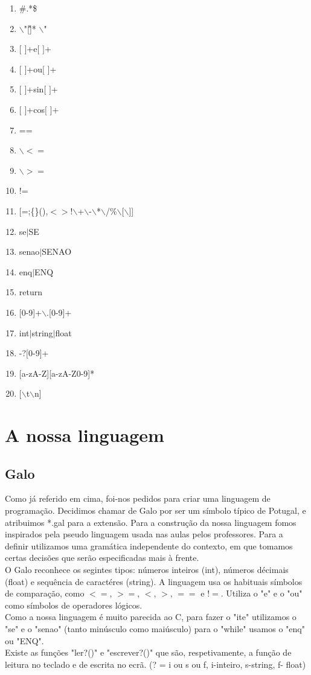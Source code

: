 \documentclass{report}
\begin{document}
\begin{enumerate}
	\item \#.*\$  
	\item $\backslash$"[\^\"]* $\backslash$"
	\item $[$ $]$+e$[$ $]$+
	\item $[$ $]$+ou$[$ $]$+
	\item $[$ $]$+sin$[$ $]$+
	\item $[$ $]$+cos$[$ $]$+
	\item ==
	\item $\backslash$$<=$
	\item $\backslash$$>=$
	\item !=
	\item $[$=;\{\}(),$<>$!$\backslash$+$\backslash$-$\backslash$*$\backslash$/\%$\backslash$[$\backslash$]]
	\item se$|$SE
	\item senao$|$SENAO 
	\item enq$|$ENQ
	\item return
	\item $[$0-9]+$\backslash$.[0-9]+ 
	\item int$|$string$|$float 
	\item -?$[$0-9]+
	\item $[$a-zA-Z][a-zA-Z0-9]*
	\item $[$$\backslash$t$\backslash$n] 
	
\end{enumerate}

\section{A nossa linguagem}
\subsection{Galo}
\indent
Como já referido em cima, foi-nos pedidos para criar uma linguagem de programação. Decidimos chamar de Galo por ser um símbolo típico de Potugal, e atribuimos *.gal para a extensão. Para a construção da nossa linguagem fomos inspirados pela pseudo linguagem usada nas aulas pelos professores.
\indent
Para a definir utilizamos uma gramática independente do contexto, em que tomamos certas decisões que serão especificadas mais à frente.\\
\indent
O Galo reconhece os segintes tipos: números inteiros (int), números décimais  (float) e sequência de caractéres (string). A linguagem usa os habituais símbolos de comparação, como $<=$, $>=$, $<$, $>$, $==$ e $!=$. Utiliza o "e" e o "ou" como símbolos de operadores lógicos.\\
\indent
Como a nossa linguagem é muito parecida ao C, para fazer o "ite" utilizamos o "se" e o "senao" (tanto minúsculo como maiúsculo) para o "while" usamos o "enq" ou "ENQ".\\
\indent
Existe as funções "ler?()" e "escrever?()" que são, respetivamente, a função de leitura no teclado e de escrita no ecrã. (? = i ou s ou f, i-inteiro, s-string, f- float) \\
\end{document}
